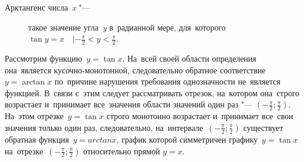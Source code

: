 \documentclass[]{scrartcl}
\begin{document}
%
\begin{description}
	\item[Арктангенс числа~\textit{x} "---] такое значение угла~\textit{y} в~радианной мере, для~которого~${\displaystyle \tan y = x \quad| -{\frac {\pi }{2}} < y < {\frac {\pi }{2}}}$.
\end{description}
Рассмотрим функцию~${\displaystyle y = \tan x}$. На~всей своей области определения она~является кусочно-монотонной, следовательно обратное соответствие~${\displaystyle y = \arctan x}$ по~причине нарушения требования однозначности не~является функцией. В~связи с~этим следует рассматривать отрезок, на~котором она~строго возрастает и~принимает все~значения области значений один раз "--- ${\displaystyle \left(-{\frac {\pi }{2}};{\frac {\pi }{2}}\right)}$. На~этом отрезке~${\displaystyle y = \tan x}$ строго монотонно возрастает и~принимает все~свои значения только один раз, следовательно, на~интервале~${\displaystyle \left(-{\frac {\pi }{2}};{\frac {\pi }{2}}\right)}$ существует обратная функция~${\displaystyle y = arctan x}$, график которой симметричен графику~${\displaystyle y = \tan x}$ на~отрезке~${\displaystyle \left(-{\frac {\pi }{2}};{\frac {\pi }{2}}\right)}$ относительно прямой ${\displaystyle y=x}$.
\end{document}
